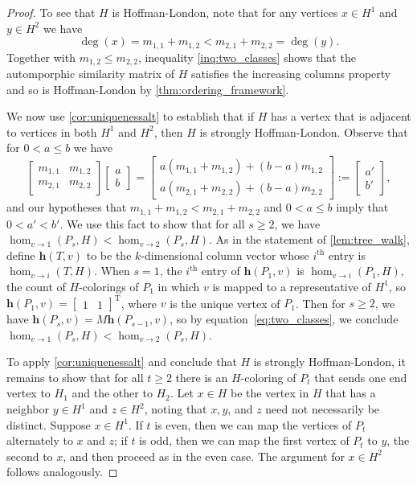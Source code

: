 \documentclass[11pt]{article}
\theoremstyle{definition}
\newcommand{\ith}[1]{$#1^{\text{th}}$}
\newcommand{\homclass}[4]{\hom_{#1\to#2}(#3,#4)}
\newcommand{\trans}{\text{T}}
\begin{document}
\begin{proof}
To see that $H$ is Hoffman-London, note that for any vertices $x \in H^1$ and $y \in H^2$ we have  
\begin{equation} \label{inq:two_classes}
\deg(x) = m_{1,1}+m_{1,2} < m_{2,1}+m_{2,2} = \deg(y).
\end{equation}
Together with $m_{1,2} \le m_{2,2}$, inequality \eqref{inq:two_classes} shows that the automporphic similarity matrix of $H$ satisfies the increasing columns property and so is Hoffman-London by \cref{thm:ordering_framework}.

We now use \cref{cor:uniquenessalt} to establish that if $H$ has a vertex that is adjacent to vertices in both $H^1$ and $H^2$, then $H$ is strongly Hoffman-London. Observe that for $0 < a \le b$ we have
\begin{equation} \label{eq:two_classes}
\begin{bmatrix}
m_{1,1} & m_{1,2} \\
m_{2,1} & m_{2,2}
\end{bmatrix}
\begin{bmatrix}
a \\
b
\end{bmatrix}
=
\begin{bmatrix}
a(m_{1,1}+m_{1,2}) + (b-a) m_{1,2} \\
a(m_{2,1}+m_{2,2}) + (b-a) m_{2,2}
\end{bmatrix}
:= 
\begin{bmatrix}
a' \\
b'
\end{bmatrix},
\end{equation}
and our hypotheses that $m_{1,1}+m_{1,2} < m_{2,1}+m_{2,2}$ and $0 < a \le b$ imply that $0 < a' < b'$. We use this fact to show that for all $s \ge 2$, we have $\homclass{v}{1}{P_s}{H} < \homclass{v}{2}{P_s}{H}$. As in the statement of \cref{lem:tree_walk}, define $\mathbf{h}(T,v)$ to be the $k$-dimensional column vector whose \ith{i} entry is $\homclass{v}{i}{T}{H}$. When $s = 1$, the \ith{i} entry of $\mathbf{h}(P_1,v)$ is $\homclass{v}{i}{P_1}{H}$, the count of $H$-colorings of $P_1$ in which $v$ is mapped to a representative of $H^1$, so $\mathbf{h}(P_1,v) = \begin{bmatrix}1 & 1\end{bmatrix}^\trans$, where $v$ is the unique vertex of $P_1$. Then for $s \ge 2$, we have $\mathbf{h}(P_s,v) = M \mathbf{h}(P_{s-1},v)$, so by equation~\eqref{eq:two_classes}, we conclude $\homclass{v}{1}{P_s}{H} < \homclass{v}{2}{P_s}{H}$.

To apply \cref{cor:uniquenessalt} and conclude that $H$ is strongly Hoffman-London, it remains to show that for all $t \ge 2$ there is an $H$-coloring of $P_t$ that sends one end vertex to $H_1$ and the other to $H_2$. Let $x \in H$ be the vertex in $H$ that has a neighbor $y \in H^1$ and $z \in H^2$, noting that $x, y$, and $z$ need not necessarily be distinct. Suppose $x \in H^1$. If $t$ is even, then we can map the vertices of $P_t$ alternately to $x$ and $z$; if $t$ is odd, then we can map the first vertex of $P_t$ to $y$, the second to $x$, and then proceed as in the even case. The argument for $x \in H^2$ follows analogously.    
\end{proof}
\end{document}
